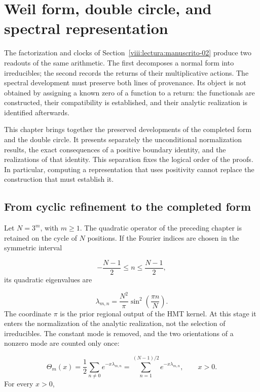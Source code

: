\section{Weil form, double circle, and spectral representation}
\label{viii:lectura:manuscrito-03}
The factorization and clocks of Section~\ref{viii:lectura:manuscrito-02} produce two readouts of the same arithmetic. The first decomposes a normal form into irreducibles; the second records the returns of their multiplicative actions. The spectral development must preserve both lines of provenance. Its object is not obtained by assigning a known zero of a function to a return: the functionals are constructed, their compatibility is established, and their analytic realization is identified afterwards.

This chapter brings together the preserved developments of the completed form and the double circle. It presents separately the unconditional normalization results, the exact consequences of a positive boundary identity, and the realizations of that identity. This separation fixes the logical order of the proofs. In particular, computing a representation that uses positivity cannot replace the construction that must establish it.

\subsection{From cyclic refinement to the completed form}
Let \(N=3^m\), with \(m\geq1\). The quadratic operator of the preceding chapter is retained on the cycle of \(N\) positions. If the Fourier indices are chosen in the symmetric interval

\[
-\frac{N-1}{2}\leq n\leq\frac{N-1}{2},
\]
its quadratic eigenvalues are

\[
\lambda_{m,n}=\frac{N^2}{\pi}\sin^2\!\left(\frac{\pi n}{N}\right).
\]
The coordinate \(\pi\) is the prior regional output of the HMT kernel. At this stage it enters the normalization of the analytic realization, not the selection of irreducibles. The constant mode is removed, and the two orientations of a nonzero mode are counted only once:

\[
\Theta_m(x)=\frac12\sum_{n\neq0}e^{-x\lambda_{m,n}}
=\sum_{n=1}^{(N-1)/2}e^{-x\lambda_{m,n}},\qquad x>0.
\]
For every \(x>0\),

